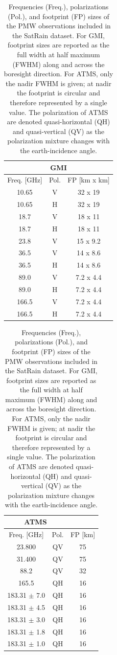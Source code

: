 \documentclass[11pt]{article}
\begin{document}
\begin{table}[htbp]
	\centering
	\begin{subtable}{0.45\textwidth}
		\centering
		\begin{tabular}{ccc}
			\multicolumn{3}{c}{GMI}           \\[0.5ex]
			\toprule
			Freq. [GHz] & Pol. & FP [km x km] \\
			\midrule
			10.65       & V    & 32 x 19      \\
			10.65       & H    & 32 x 19      \\
			18.7        & V    & 18 x 11      \\
			18.7        & H    & 18 x 11      \\
			23.8        & V    & 15 x 9.2     \\
			36.5        & V    & 14 x 8.6     \\
			36.5        & H    & 14 x 8.6     \\
			89.0        & V    & 7.2 x 4.4    \\
			89.0        & H    & 7.2 x 4.4    \\
			166.5       & V    & 7.2 x 4.4    \\
			166.5       & H    & 7.2 x 4.4    \\
			\bottomrule
		\end{tabular}
	\end{subtable}%
	\hfill%
	\begin{subtable}{0.45\textwidth}
		\centering
		\begin{tabular}{ccc}
			\multicolumn{2}{c}{ATMS}          \\[0.5ex]
			\toprule
			Freq. [GHz]      & Pol. & FP [km] \\
			\midrule
			23.800           & QV   & 75      \\
			31.400           & QV   & 75      \\
			88.2             & QV   & 32      \\
			165.5            & QH   & 16      \\
			183.31 $\pm$ 7.0 & QH   & 16      \\
			183.31 $\pm$ 4.5 & QH   & 16      \\
			183.31 $\pm$ 3.0 & QH   & 16      \\
			183.31 $\pm$ 1.8 & QH   & 16      \\
			183.31 $\pm$ 1.0 & QH   & 16      \\
			\bottomrule
		\end{tabular}
	\end{subtable}
	\caption{
		Frequencies (Freq.), polarizations (Pol.), and footprint (FP) sizes of the
		PMW observations included in the SatRain dataset. For GMI, footprint sizes are
		reported as the full width at half maximum (FWHM) along and across the
		boresight direction. For ATMS, only the nadir FWHM is given; at nadir the
		footprint is circular and therefore represented by a single value. The
		polarization of ATMS are denoted quasi-horizontal (QH) and quasi-vertical (QV)
		as the polarization mixture changes with the earth-incidence angle.
	}
	\label{tab:pmw_channels}
\end{table}
\end{document}
